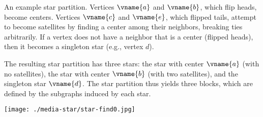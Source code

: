 \begin{group}
\begin{example}
\label{ex:startpartition}
An example star partition. Vertices $\vname{a}$ and $\vname{b}$, which
flip heads, become centers. Vertices $\vname{c}$ and $\vname{e}$,
which flipped tails, attempt to become satellites by finding a center
among their neighbors, breaking ties arbitrarily.
%
If a vertex does not have a neighbor that is a center (flipped heads),
then it becomes a singleton star (e.g., vertex $d$).
%

The resulting star partition has three stars: the star with center $\vname{a}$ (with no
satellites), the star with center $\vname{b}$ (with two satellites),
and the singleton star $\vname{d}$.
%
The star partition thus yields three blocks, which are defined by the
subgraphs induced by each star.

\begin{center}
  \texttt{[image: ./media-star/star-find0.jpg]}
\end{center}

\end{example}
\end{group}


